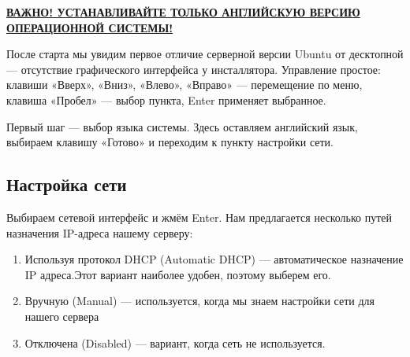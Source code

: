\documentclass[14pt, a4paper]{article}
\begin{document}
\begin{figure}[h]%
    \centering
    \label{1.2} %
\end{figure}
\textbf{\uline{ВАЖНО! УСТАНАВЛИВАЙТЕ ТОЛЬКО АНГЛИЙСКУЮ ВЕРСИЮ ОПЕРАЦИОННОЙ СИСТЕМЫ!}}

После старта мы увидим первое отличие серверной версии Ubuntu от десктопной —
отсутствие графического интерфейса у инсталлятора. Управление простое: клавиши «Вверх», «Вниз»,
«Влево», «Вправо» — перемещение по меню, клавиша «Пробел» — выбор пункта, Enter применяет
выбранное.

Первый шаг — выбор языка системы. Здесь оставляем английский язык, выбираем клавишу
«Готово» и переходим к пункту настройки сети.\\


\subsection*{Настройка сети}

Выбираем сетевой интерфейс и жмём Enter. Нам предлагается несколько путей назначения
IP-адреса нашему серверу:

\begin{enumerate}
    \item Используя протокол DHCP (Automatic DHCP) — автоматическое назначение IP адреса.Этот
    вариант наиболее удобен, поэтому выберем его.
    \item Вручную (Manual) — используется, когда мы знаем настройки сети для нашего сервера
    \item Отключена (Disabled) — вариант, когда сеть не используется.
\end{enumerate}
\end{document}
